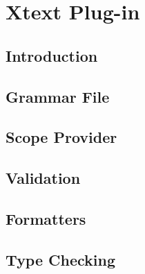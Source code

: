 \chapter{\label{xtext}Xtext Plug-in}
\section{\label{xtext:intro}Introduction}
\section{\label{xtext:grammar}Grammar File}
\section{\label{xtext:scope}Scope Provider}
\section{\label{xtext:validation}Validation}
\section{\label{xtext:format}Formatters}
\section{\label{xtext:type}Type Checking}
